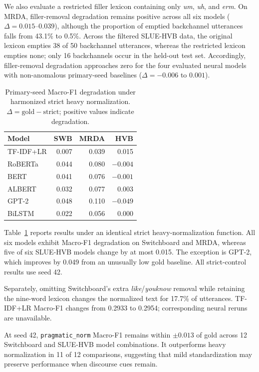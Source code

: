 \documentclass[conference]{IEEEtran}
\begin{document}
We also evaluate a restricted filler lexicon containing
only \textit{um}, \textit{uh}, and \textit{erm}.
On MRDA, filler-removal degradation remains positive
across all six models ($\Delta=0.015$--$0.039$),
although the proportion of emptied backchannel
utterances falls from 43.1\% to 0.5\%.
Across the filtered SLUE-HVB data, the original
lexicon empties 38 of 50 backchannel utterances,
whereas the restricted lexicon empties none; only
16 backchannels occur in the held-out test set.
Accordingly, filler-removal degradation
approaches zero for the four evaluated neural models
with non-anomalous primary-seed baselines
($\Delta=-0.006$ to $0.001$).

\begin{table}[t]
\caption{Primary-seed Macro-F1 degradation under
harmonized strict heavy normalization.
$\Delta=\mathrm{gold}-\mathrm{strict}$;
positive values indicate degradation.}
\label{tab:strict}
\centering
\scriptsize
\setlength{\tabcolsep}{5pt}
\renewcommand{\arraystretch}{1.0}
\begin{tabular}{@{}lrrr@{}}
\toprule
\textbf{Model} &
\textbf{SWB} & \textbf{MRDA} & \textbf{HVB} \\
\midrule
TF-IDF+LR & 0.007 & 0.039 & 0.015 \\
RoBERTa   & 0.044 & 0.080 & $-0.004$ \\
BERT      & 0.041 & 0.076 & $-0.001$ \\
ALBERT    & 0.032 & 0.077 & 0.003 \\
GPT-2     & 0.048 & 0.110 & $-0.049$ \\
BiLSTM    & 0.022 & 0.056 & 0.000 \\
\bottomrule
\end{tabular}
\end{table}

Table~\ref{tab:strict} reports results under an
identical strict heavy-normalization function.
All six models exhibit Macro-F1 degradation on
Switchboard and MRDA, whereas five of six SLUE-HVB models change
by at most 0.015. The exception is GPT-2, which
improves by 0.049 from an unusually low gold
baseline. All strict-control results use seed 42.

Separately, omitting Switchboard's extra
\textit{like}/\textit{youknow} removal while retaining the
nine-word lexicon changes the normalized text
for 17.7\% of utterances. TF-IDF+LR Macro-F1
changes from 0.2933 to 0.2954; corresponding
neural reruns are unavailable.

At seed 42, \texttt{pragmatic\_norm} Macro-F1
remains within $\pm0.013$ of gold across 12
Switchboard and SLUE-HVB model combinations.
It outperforms heavy normalization in 11 of 12
comparisons, suggesting that mild standardization
may preserve performance when discourse cues remain.
\end{document}
